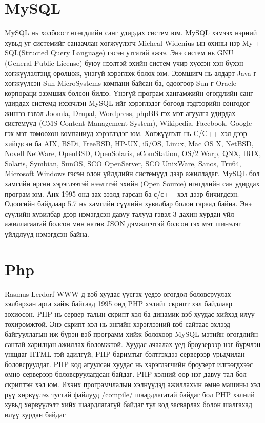 \section{MySQL}
MySQL нь холбоост өгөгдлийн санг удирдах систем юм. MySQL хэмээх нэрний хувьд уг системийг санаачлан хөгжүүлэгч Micheal Widenius-ын охины нэр My + SQL(Structed Query Language) гэсэн утгатай ажээ.
Энэ систем нь GNU (General Public License) буюу нээлтэй эхийн систем учир хүссэн хэн бүхэн хөгжүүлэлтэнд оролцож, үнэгүй хэрэглэж болох юм. Эзэмшигч нь алдарт Java-г хөгжүүлсэн Sun MicroSystems компани байсан ба, одоогоор Sun-г Oracle корпораци эзэмших болсон билээ.
Үнэгүй програм хангамжийн өгөгдлийн санг удирдах системд ихэвчлэн MySQL-ийг хэрэглэдэг бөгөөд тэдгээрийн сонгодог жишээ гэвэл Joomla, Drupal, Wordpress, phpBB гэх мэт агуулга удирдах системүүд (CMS-Content Management System), Wikipedia, Facebook, Google гэх мэт томоохон компаниуд хэрэглэдэг юм.
Хөгжүүлэлт нь C/C++ хэл дээр хийгдсэн ба AIX, BSDi, FreeBSD, HP-UX, i5/OS, Linux, Mac OS X, NetBSD, Novell NetWare, OpenBSD, OpenSolaris, eComStation, OS/2 Warp, QNX, IRIX, Solaris, Symbian, SunOS, SCO OpenServer, SCO UnixWare, Sanos, Tru64, Microsoft Windows гэсэн олон үйлдлийн системүүд дээр ажилладаг.
MySQL бол хамгийн өргөн хэрэглээтэй нээлттэй эхийн (Open Source) өгөгдлийн сан удирдах програм юм. Анх 1995 онд зах зээлд гарсан ба с/с++ хэл дээр бичигдсэн. Одоогийн байдлаар 5.7 нь хамгийн сүүлийн хувилбар болон гараад байна. Энэ сүүлийн хувилбар дээр нэмэгдсэн давуу талууд гэвэл 3 дахин хурдан үйл ажиллагаатай болсон мөн натив JSON дэмжигчтэй болсон гэх мэт шинэлэг үйлдлүүд нэмэгдсэн байна.

\section{Php}
  Rasmus Lerdorf WWW-д вэб хуудас үүсгэх үедээ өгөгдөл боловсруулах хялбархан арга хайж байгаад 1995 онд PHP хэлийг скрипт хэл байдлаар зохиосон.
PHP нь сервер талын скрипт хэл ба динамик вэб хуудас хийхэд илүү тохиромжтой. Энэ скрипт хэл нь энгийн хэрэглээний вэб сайтаас эхлээд байгууллагын иж бүрэн вэб программ хийж болохоор MySQL мэтийн өгөгдлийн сантай харилцан ажиллах боломжтой.
Хуудас ачаалах үед броузерээр нэг бүрчлэн уншдаг HTML-тэй адилгүй, PHP баримтыг бэлтгэхдээ серверээр урьдчилан боловсруулдаг. PHP код агуулсан хуудас нь хэрэглэгчийн броузерт илгээгдхээс өмнө серверээр боловсруулагдсан байдаг.
PHP хэлний өөр нэг давуу тал бол скриптэн хэл юм. Ихэнх програмчлалын хэлнүүдэд ажиллахын өмнө машины хэл рүү хөрвүүлэх тусгай файлууд /compile/ шаардлагатай байдаг бол PHP хэлний хувьд хөрвүүлэлт хийх шаардлагагүй байдаг тул код засварлах болон шалгахад илүү хурдан байдаг

